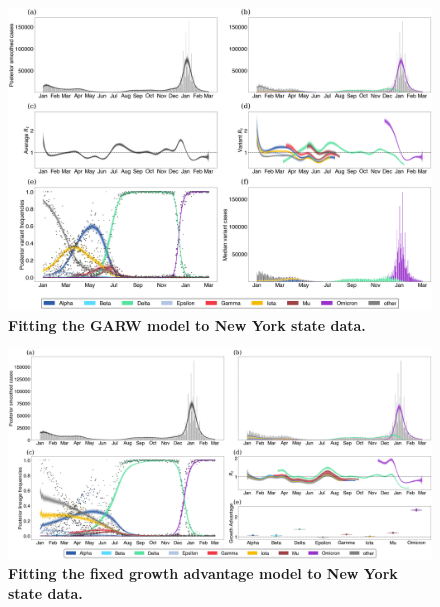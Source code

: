 \begin{figure}
  \centering
  \includegraphics[width=\linewidth]{figs/GARW_rt_New-York.png}
  \caption{\textbf{Fitting the GARW model to New York state data.}}%
  \label{fig:GARW_rt_New-York}
\end{figure}

\begin{figure}
  \centering
  \includegraphics[width=\linewidth]{figs/fixed_growth_New-York.png}
  \caption{\textbf{Fitting the fixed growth advantage model to New York state data.}}%
  \label{fig:fixed_growth_New-York}
\end{figure}

\clearpage

